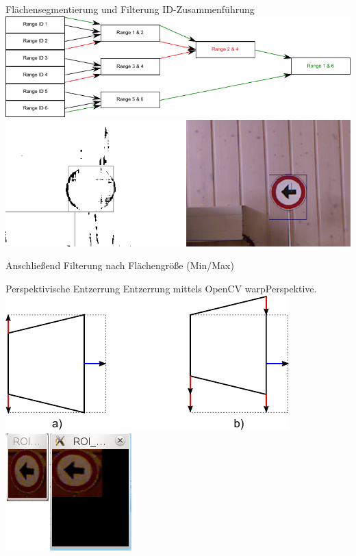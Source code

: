 \documentclass{VLKlauck}
\begin{document}
	\begin{frame}{Flächensegmentierung und Filterung}
		ID-Zusammenführung
		\includegraphics[scale=0.8]{merging.pdf}\\
		\includegraphics[scale=0.8]{AnglesOkSegment.png}
		
		Anschließend Filterung nach Flächengröße (Min/Max)
	\end{frame}

	\begin{frame}{Perspektivische Entzerrung}
		Entzerrung mittels OpenCV warpPerspektive.\\
		\includegraphics[scale=0.8]{PerspectiveTransform.pdf}\\ 
		\includegraphics[scale=1]{warpPerspective.png}
	\end{frame}
	
\end{document}
